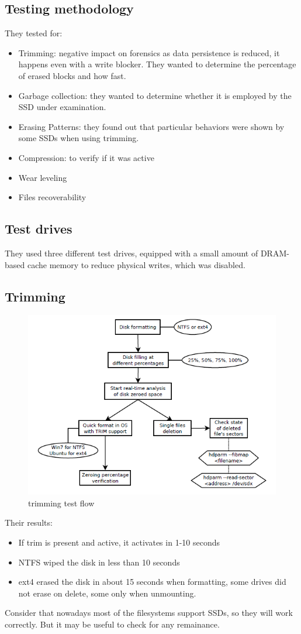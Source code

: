     \subsection{Testing methodology}
        They tested for:
        \begin{itemize}
            \item Trimming: negative impact on forensics as data persistence is reduced, it happens even with a write blocker. They wanted to determine the percentage of erased blocks and how fast.
            \item Garbage collection: they wanted to determine whether it is employed by the SSD under examination.
            \item Erasing Patterns: they found out that particular behaviors were shown by some SSDs when using trimming.
            \item Compression: to verify if it was active
            \item Wear leveling
            \item Files recoverability 
        \end{itemize}
    \subsection{Test drives}
        They used three different test drives, equipped with a small amount of DRAM-based cache memory to reduce physical writes, which was disabled.
    \subsection{Trimming}
        \begin{figure}[ht!]
            \centering
            \includegraphics[width=0.8\linewidth]{trim.png}
            \caption{trimming test flow}
        \end{figure}
        Their results:
        \begin{itemize}
            \item If trim is present and active, it activates in 1-10 seconds 
            \item NTFS wiped the disk in less than 10 seconds 
            \item ext4 erased the disk in about 15 seconds when formatting, some drives did not erase on delete, some only when unmounting.
        \end{itemize}
        Consider that nowadays most of the filesystems support SSDs, so they will work correctly. But it may be useful to check for any remainance.
